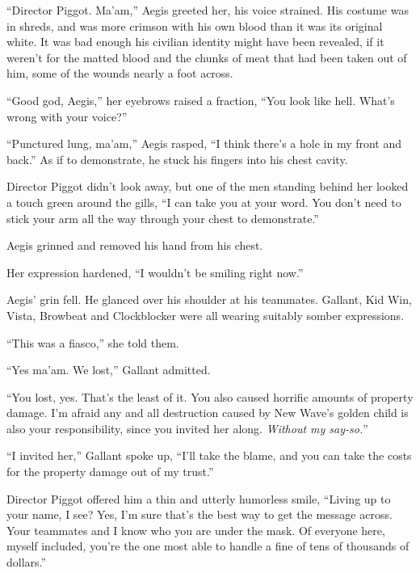 ``Director Piggot.  Ma'am,'' Aegis greeted her, his voice strained.  His costume was in shreds, and was more crimson with his own blood than it was its original white.  It was bad enough his civilian identity might have been revealed, if it weren't for the matted blood and the chunks of meat that had been taken out of him, some of the wounds nearly a foot across.



``Good god, Aegis,'' her eyebrows raised a fraction, ``You look like hell.  What's wrong with your voice?''



``Punctured lung, ma'am,'' Aegis rasped, ``I think there's a hole in my front and back.''  As if to demonstrate, he stuck his fingers into his chest cavity.



Director Piggot didn't look away, but one of the men standing behind her looked a touch green around the gills, ``I can take you at your word.  You don't need to stick your arm all the way through your chest to demonstrate.''



Aegis grinned and removed his hand from his chest.



Her expression hardened, ``I wouldn't be smiling right now.''



Aegis' grin fell.  He glanced over his shoulder at his teammates.  Gallant, Kid Win, Vista, Browbeat and Clockblocker were all wearing suitably somber expressions.



``This was a fiasco,'' she told them.



``Yes ma'am.  We lost,'' Gallant admitted.



``You lost, yes.  That's the least of it.  You also caused horrific amounts of property damage.  I'm afraid any and all destruction caused by New Wave's golden child is also your responsibility, since you invited her along.  \emph{Without my say-so.}''



``I invited her,'' Gallant spoke up, ``I'll take the blame, and you can take the costs for the property damage out of my trust.''



Director Piggot offered him a thin and utterly humorless smile, ``Living up to your name, I see?  Yes, I'm sure that's the best way to get the message across.  Your teammates and I know who you are under the mask.  Of everyone here, myself included, you're the one most able to handle a fine of tens of thousands of dollars.''



